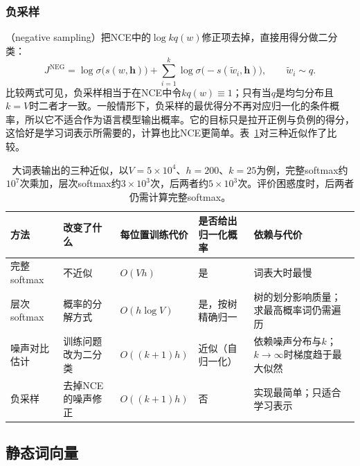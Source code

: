 \subsubsection{负采样}
\label{sec:nlp-classical-negative-sampling}

（negative sampling）把NCE中的$\log kq(w)$修正项去掉，直接用得分做二分类：
\begin{equation}
  J^{\mathrm{NEG}}=\log\sigma\bigl(s(w,\bm h)\bigr)+\sum_{i=1}^{k}\log\sigma\bigl(-s(\tilde w_i,\bm h)\bigr),\qquad \tilde w_i\sim q.
  \label{eq:nlp-classical-neg}
\end{equation}
比较两式可见，负采样相当于在NCE中令$kq(w)\equiv1$；只有当$q$是均匀分布且$k=V$时二者才一致。一般情形下，负采样的最优得分不再对应归一化的条件概率，所以它不适合作为语言模型输出概率。它的目标只是拉开正例与负例的得分，这恰好是学习词表示所需要的，计算也比NCE更简单。表~\ref{tab:nlp-classical-output-approx}对三种近似作了比较。

\begin{table}[htbp]
  \begin{tabularx}{\linewidth}{@{}>{\raggedright\arraybackslash}p{24mm}>{\raggedright\arraybackslash}p{30mm}>{\raggedright\arraybackslash}p{30mm}>{\raggedright\arraybackslash}p{32mm}>{\raggedright\arraybackslash}X@{}}
    \toprule
    方法 & 改变了什么 & 每位置训练代价 & 是否给出归一化概率 & 依赖与代价\\
    \midrule
    完整softmax & 不近似 & $O(Vh)$ & 是 & 词表大时最慢\\
    层次softmax & 概率的分解方式 & $O(h\log V)$ & 是，按树精确归一 & 树的划分影响质量；求最高概率词仍需遍历\\
    噪声对比估计 & 训练问题改为二分类 & $O((k+1)h)$ & 近似（自归一化） & 依赖噪声分布与$k$；$k\to\infty$时梯度趋于最大似然\\
    负采样 & 去掉NCE的噪声修正 & $O((k+1)h)$ & 否 & 实现最简单；只适合学习表示\\
    \bottomrule
  \end{tabularx}
  \caption{大词表输出的三种近似，以$V=5\times10^4$、$h=200$、$k=25$为例，完整softmax约$10^7$次乘加，层次softmax约$3\times10^3$次，后两者约$5\times10^3$次。评价困惑度时，后两者仍需计算完整softmax。}
  \label{tab:nlp-classical-output-approx}
\end{table}

\subsection{静态词向量}
\label{sec:nlp-classical-word-vectors}


